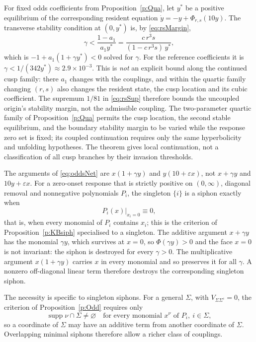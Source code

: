 For fixed odds coefficients from Proposition~\ref{p:Qua}, let $y^*$
be a positive equilibrium of the corresponding resident equation
$\dot y=-y+\Phi_{r,s}(10y)$. The transverse stability condition at
$(0,y^*)$ is, by \eqref{eq:rsMargin},
\begin{equation}\label{eq:rsGamma}
 \gamma<\frac{1-a_1}{a_1y^*}=\frac{c\,r^3s}{(1-c\,r^3s)\,y^*},
\end{equation}
which is $-1+a_1(1+\gamma y^*)<0$ solved for $\gamma$. For the reference
coefficients it is $\gamma<1/(342y^*)\approx2.9\times10^{-3}$.
This is \emph{not} an explicit bound along the continued cusp family: there $a_1$ changes with
the couplings, and within the quartic family changing $(r,s)$ also changes the resident state,
the cusp location and its cubic coefficient. The supremum $1/81$ in \eqref{eq:rsSup} therefore
bounds the uncoupled origin's stability margin, not the admissible coupling. The two-parameter quartic
family of Proposition~\ref{p:Qua} permits the cusp location, the
second stable equilibrium, and the boundary stability margin to be
varied while the response zero set is fixed; its coupled continuation
requires only the same hyperbolicity and unfolding hypotheses.
The theorem gives local continuation, not a classification of all cusp
branches by their invasion thresholds.
\eeR

The arguments of \eqref{eq:oddsNet} are $x(1+\gamma y)$ and $y(10+\varepsilon x)$,
not $x+\gamma y$ and $10y+\varepsilon x$. For a zero-onset response that is strictly positive on $(0,\infty)$,
diagonal removal and nonnegative polynomials $P_i$, the singleton $\{i\}$ is a
siphon exactly when
\[
 P_i(x)\big|_{x_i=0}\equiv0,
\]
that is, when every monomial of $P_i$ contains $x_i$; this is the criterion of
Proposition~\ref{p:KBsiph} specialised to a singleton. The additive argument
$x+\gamma y$ has the monomial $\gamma y$, which survives at $x=0$, so
$\Phi(\gamma y)>0$ and the face $x=0$ is not invariant: the siphon is destroyed for
every $\gamma>0$. The multiplicative argument $x(1+\gamma y)$ carries $x$ in every
monomial and so preserves it for all $\gamma$. A nonzero off-diagonal linear term therefore destroys the
corresponding singleton siphon.

The necessity is specific to singleton siphons. For a general $\Sigma$, with
$V_{\Sigma\Sigma^c}=0$, the criterion of Proposition~\ref{p:Odd} requires only
\[
 \operatorname{supp}\nu\cap\Sigma\ne\varnothing
 \quad\text{for every monomial }x^\nu\text{ of }P_i,\ i\in\Sigma,
\]
so a coordinate of $\Sigma$ may have an additive term from another coordinate of
$\Sigma$. Overlapping minimal siphons therefore allow a richer class of couplings.
\eeR

